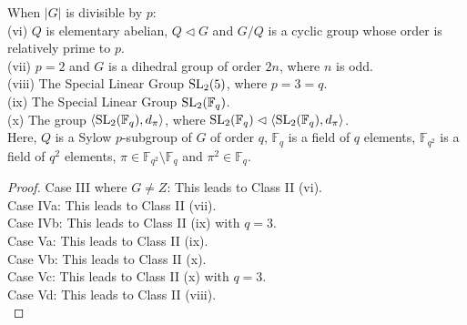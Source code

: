 \begin{theorem}[Class II]
    \label{dicksons_classification_theorem_class_II}
    When $|G|$ is divisible by $p$: \vspace{1mm} \\
(vi) $Q$ is elementary abelian, $Q \vartriangleleft G$ and $G/Q$ is a cyclic group whose order is relatively prime to $p$. \vspace{3mm} \\
(vii) $p=2$ and $G$ is a dihedral group of order $2n$, where $n$ is odd. \vspace{3mm} \\
(viii) The Special Linear Group $\operatorname{SL}_2(5)$, where $p=3=q$. \vspace{3mm} \\
(ix) The Special Linear Group $\operatorname{SL}_2(\mathbb{F}_q)$. \vspace{3mm} \\
(x) The group $\langle \operatorname{SL}_2(\mathbb{F}_q), d_\pi \rangle$, where $\operatorname{SL}_2(\mathbb{F}_q) \vartriangleleft \langle \operatorname{SL}_2(\mathbb{F}_q), d_\pi \rangle$. \vspace{3mm} \\

Here, $Q$ is a Sylow $p$-subgroup of $G$ of order $q$, $\mathbb{F}_q$ is a field of $q$ elements, $\mathbb{F}_{q^2}$ is a field of $q^2$ elements, $\pi \in \mathbb{F}_{q^2} \setminus \mathbb{F}_q$ and $\pi^2 \in \mathbb{F}_q$. \vspace{3mm}
\end{theorem}

\begin{proof}%

Case III where $G \ne Z$: This leads to Class II (vi). \\
Case IVa: This leads to Class II (vii). \\
Case IVb: This leads to Class II (ix) with $q=3$. \\
Case Va: This leads to Class II (ix). \\
Case Vb: This leads to Class II (x). \\
Case Vc: This leads to Class II (x) with $q=3$. \\
Case Vd: This leads to Class II (viii). \\
\end{proof}

